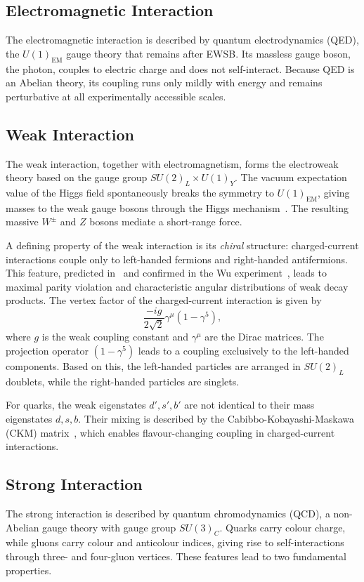 \subsection{Electromagnetic Interaction}
The electromagnetic interaction is described by quantum electrodynamics (QED), the $U(1)_{\mathrm{EM}}$ gauge theory that remains after EWSB. Its massless gauge boson, the photon, couples to electric charge and does not self-interact. Because QED is an Abelian theory, its coupling runs only mildly with energy and remains perturbative at all experimentally accessible scales.
\subsection{Weak Interaction}
The weak interaction, together with electromagnetism, forms the electroweak theory based on the gauge group $SU(2)_L \times U(1)_Y$. The vacuum expectation value of the Higgs field spontaneously breaks the symmetry to $U(1)_{\mathrm{EM}}$, giving masses to the weak gauge bosons through the Higgs mechanism~\cite{higgs1,higgs2,higgs3}. The resulting massive $W^\pm$ and $Z$ bosons mediate a short-range force. 

A defining property of the weak interaction is its \emph{chiral} structure: charged-current interactions couple only to left-handed fermions and right-handed antifermions. This feature, predicted in~\cite{Parity_Violation_Theory} and confirmed in the Wu experiment~\cite{WU_Exp}, leads to maximal parity violation and characteristic angular distributions of weak decay products. The vertex factor of the charged-current interaction is given by 
\begin{equation}
  \frac{-ig}{2\sqrt{2}} \gamma^\mu (1 - \gamma^5),
\end{equation}
where $g$ is the weak coupling constant and $\gamma^\mu$ are the Dirac matrices. The projection operator $(1 - \gamma^5)$ leads to a coupling exclusively to the left-handed components. Based on this, the left-handed particles are arranged in $SU(2)_L$ doublets, while the right-handed particles are singlets.

For quarks, the weak eigenstates $d',s',b'$ are not identical to their mass eigenstates $d,s,b$. Their mixing is described by the Cabibbo-Kobayashi-Maskawa (CKM) matrix~\cite{cabibbo,kobayashi_maskawa}, which enables flavour-changing coupling in charged-current interactions.

\subsection{Strong Interaction}
\label{sec:strong_interaction}
The strong interaction is described by quantum chromodynamics (QCD), a non-Abelian gauge theory with gauge group $SU(3)_C$. Quarks carry colour charge, while gluons carry colour and anticolour indices, giving rise to self-interactions through three- and four-gluon vertices.
These features lead to two fundamental properties.

